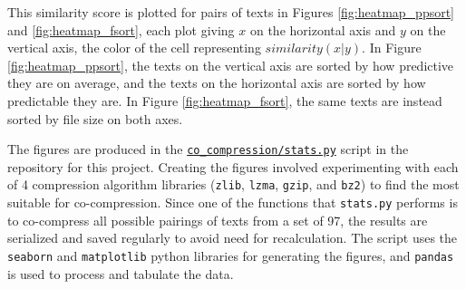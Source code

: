 This similarity score is plotted for pairs of texts in Figures \ref{fig:heatmap_ppsort} and \ref{fig:heatmap_fsort}, each plot giving \(x\) on the horizontal axis and \(y\) on the vertical axis, the color of the cell representing \(similarity(x|y)\). In Figure \ref{fig:heatmap_ppsort}, the texts on the vertical axis are sorted by how predictive they are on average, and the texts on the horizontal axis are sorted by how predictable they are. In Figure \ref{fig:heatmap_fsort}, the same texts are instead sorted by file size on both axes.

The figures are produced in the  \texttt{\href{https://github.com/Guy29/FYP/blob/main/Code/co_compression/stats.py}{co\_compression/stats.py}} script in the repository for this project. Creating the figures involved experimenting with each of 4 compression algorithm libraries (\texttt{zlib}, \texttt{lzma}, \texttt{gzip}, and \texttt{bz2}) to find the most suitable for co-compression. Since one of the functions that \texttt{stats.py} performs is to co-compress all possible pairings of texts from a set of 97, the results are serialized and saved regularly to avoid need for recalculation. The script uses the \texttt{seaborn} and \texttt{matplotlib} python libraries for generating the figures, and \texttt{pandas} is used to process and tabulate the data.

